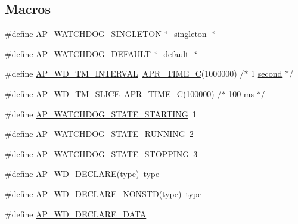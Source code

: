 \subsection*{Macros}
\begin{DoxyCompactItemize}
\item 
\#define \hyperlink{group__MOD__WATCHDOG_ga81147bd76f85b79d649e67b906bfae55}{A\+P\+\_\+\+W\+A\+T\+C\+H\+D\+O\+G\+\_\+\+S\+I\+N\+G\+L\+E\+T\+ON}~\char`\"{}\+\_\+singleton\+\_\+\char`\"{}
\item 
\#define \hyperlink{group__MOD__WATCHDOG_ga9593bcb81a9d908014e6ace95134f9ba}{A\+P\+\_\+\+W\+A\+T\+C\+H\+D\+O\+G\+\_\+\+D\+E\+F\+A\+U\+LT}~\char`\"{}\+\_\+default\+\_\+\char`\"{}
\item 
\#define \hyperlink{group__MOD__WATCHDOG_ga75dd81c7441cf0c1a7e919ab46a45183}{A\+P\+\_\+\+W\+D\+\_\+\+T\+M\+\_\+\+I\+N\+T\+E\+R\+V\+AL}~\hyperlink{group__apr__time_gab0d08005432bbda78e03bcd2e235e7d3}{A\+P\+R\+\_\+\+T\+I\+M\+E\+\_\+C}(1000000)  /$\ast$ 1 \hyperlink{group__apr__tables_gade8df35e4d83c24788cf409262f7fc51}{second}     $\ast$/
\item 
\#define \hyperlink{group__MOD__WATCHDOG_gabd6cd3634e9dbe58637f071e66bdd04f}{A\+P\+\_\+\+W\+D\+\_\+\+T\+M\+\_\+\+S\+L\+I\+CE}~\hyperlink{group__apr__time_gab0d08005432bbda78e03bcd2e235e7d3}{A\+P\+R\+\_\+\+T\+I\+M\+E\+\_\+C}(100000)   /$\ast$ 100 \hyperlink{group__APR__Util__MC_gabcfc3d1de80e72f78d877d87639acdd2}{ms}       $\ast$/
\item 
\#define \hyperlink{group__MOD__WATCHDOG_ga4310fd2536b3c520816902eef3241849}{A\+P\+\_\+\+W\+A\+T\+C\+H\+D\+O\+G\+\_\+\+S\+T\+A\+T\+E\+\_\+\+S\+T\+A\+R\+T\+I\+NG}~1
\item 
\#define \hyperlink{group__MOD__WATCHDOG_ga66c16555481fda9d7ab6c80c086f29f2}{A\+P\+\_\+\+W\+A\+T\+C\+H\+D\+O\+G\+\_\+\+S\+T\+A\+T\+E\+\_\+\+R\+U\+N\+N\+I\+NG}~2
\item 
\#define \hyperlink{group__MOD__WATCHDOG_ga48abe97cc371636d72a30670d934ace9}{A\+P\+\_\+\+W\+A\+T\+C\+H\+D\+O\+G\+\_\+\+S\+T\+A\+T\+E\+\_\+\+S\+T\+O\+P\+P\+I\+NG}~3
\item 
\#define \hyperlink{group__MOD__WATCHDOG_gaa4eec976fcc4b535b7b8ba17ca86a9a8}{A\+P\+\_\+\+W\+D\+\_\+\+D\+E\+C\+L\+A\+RE}(\hyperlink{pcre_8txt_a2463fbbe8b0c90b90db12195e1edaa5d}{type})~\hyperlink{pcre_8txt_a2463fbbe8b0c90b90db12195e1edaa5d}{type}
\item 
\#define \hyperlink{group__MOD__WATCHDOG_gad1c5c6d31e447194c120a2bdbc2a99cc}{A\+P\+\_\+\+W\+D\+\_\+\+D\+E\+C\+L\+A\+R\+E\+\_\+\+N\+O\+N\+S\+TD}(\hyperlink{pcre_8txt_a2463fbbe8b0c90b90db12195e1edaa5d}{type})~\hyperlink{pcre_8txt_a2463fbbe8b0c90b90db12195e1edaa5d}{type}
\item 
\#define \hyperlink{group__MOD__WATCHDOG_gacabd3114016e75c98da85bda052f27e8}{A\+P\+\_\+\+W\+D\+\_\+\+D\+E\+C\+L\+A\+R\+E\+\_\+\+D\+A\+TA}
\end{DoxyCompactItemize}
